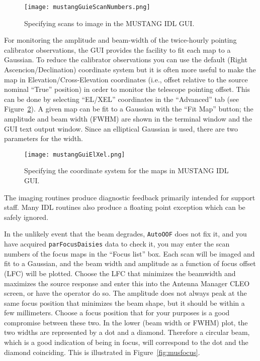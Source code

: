 \begin{figure}
\texttt{[image: mustangGuieScanNumbers.png]}
\caption{Specifying scans to image in the MUSTANG IDL GUI.}
\label{fig:mapgui}
\end{figure}

For monitoring the amplitude and beam-width of the twice-hourly
pointing calibrator observations, the GUI provides the facility to fit
each map to a Gaussian. To reduce the calibrator observations you can
use the default (Right Ascencion/Declination) coordinate system but it
is often more useful to make the map in Elevation/Cross-Elevation
coordinates (i.e., offset relative to the source nominal ``True''
position) in order to monitor the telescope pointing offset.
This can be done by selecting ``EL/XEL'' coordinates in the ``Advanced''
tab (see Figure~\ref{fig:elxel}). A given map can be fit to a Gaussian with the ``Fit Map'' button;
the amplitude and beam width (FWHM) are shown in the terminal
window and the GUI text output window. Since an elliptical Gaussian
is used, there are two parameters for the width.

\begin{figure}
\texttt{[image: mustangGuiElXel.png]}
\caption{Specifying the coordinate system for the maps in MUSTANG IDL GUI.}
\label{fig:elxel}
\end{figure}

The imaging routines produce diagnostic feedback primarily intended
for support staff. Many IDL routines also produce a floating point
exception which can be safely ignored.

In the unlikely event that the beam degrades, {\tt AutoOOF} does not
fix it, and you have acquired {\tt parFocusDaisies} data to check it,
you may enter the scan numbers of the focus maps in the ``Focus list''
box. Each scan will be imaged and fit to a Gaussian, and the beam
width and amplitude as a function of focus offset (LFC) will be
plotted.  Choose the LFC that minimizes the beamwidth and maximizes
the source response and enter this into the Antenna Manager CLEO
screen, or have the operator do so.  The amplitude does not always
peak at the same focus position that minimizes the beam shape, but it
should be within a few millimeters.  Choose a focus position that for
your purposes is a good compromise between these two. In the lower
(beam width or FWHM) plot, the two widths are represented by a dot and
a diamond. Therefore a circular beam, which is a good indication of
being in focus, will correspond to the dot and the diamond coinciding.
This is illustrated in Figure~\ref{fig:musfocus}.


